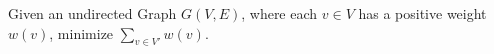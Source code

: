 \begin{defi}
\label{sub:mwvc}
Given an undirected Graph $G(V,E)$, where each $v \in V$ has a positive weight $w(v)$, minimize $\sum_{v \in V'} w(v)$.
\end{defi}
